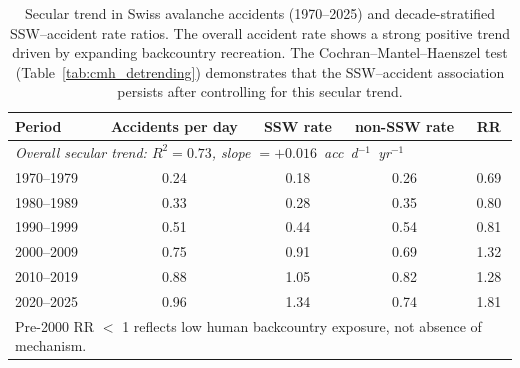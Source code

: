 \documentclass[11pt,letterpaper]{article}
\begin{document}
\begin{table}[htbp]
\caption{Secular trend in Swiss avalanche accidents (1970--2025) and decade-stratified SSW--accident rate ratios. The overall accident rate shows a strong positive trend driven by expanding backcountry recreation. The Cochran--Mantel--Haenszel test (Table~\ref{tab:cmh_detrending}) demonstrates that the SSW--accident association persists after controlling for this secular trend.}
\label{tab:secular_trend}
\small
\begin{tabular}{lcccc}
\toprule
Period & Accidents per day & SSW rate & non-SSW rate & RR \\
\midrule
\multicolumn{5}{l}{\textit{Overall secular trend: $R^2 = 0.73$, slope $= +0.016$~acc~d$^{-1}$~yr$^{-1}$}} \\
\midrule
1970--1979 & 0.24 & 0.18 & 0.26 & 0.69 \\
1980--1989 & 0.33 & 0.28 & 0.35 & 0.80 \\
1990--1999 & 0.51 & 0.44 & 0.54 & 0.81 \\
2000--2009 & 0.75 & 0.91 & 0.69 & 1.32 \\
2010--2019 & 0.88 & 1.05 & 0.82 & 1.28 \\
2020--2025 & 0.96 & 1.34 & 0.74 & 1.81 \\
\bottomrule
\multicolumn{5}{l}{\footnotesize Pre-2000 RR $<$ 1 reflects low human backcountry exposure, not absence of mechanism.} \\
\end{tabular}
\end{table}
\end{document}
